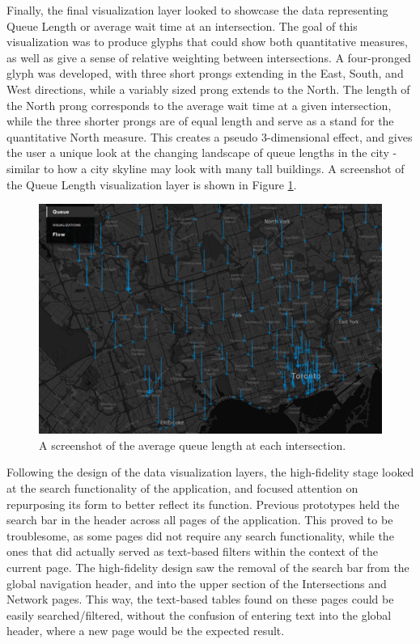 \documentclass{report}
\begin{document}
Finally, the final visualization layer looked to showcase the data representing Queue Length or average wait time at an intersection.
The goal of this visualization was to produce glyphs that could show both quantitative measures, as well as give a sense of relative weighting between intersections.
A four-pronged glyph was developed, with three short prongs extending in the East, South, and West directions, while a variably sized prong extends to the North.
The length of the North prong corresponds to the average wait time at a given intersection, while the three shorter prongs are of equal length and serve as a stand for the quantitative North measure.
This creates a pseudo 3-dimensional effect, and gives the user a unique look at the changing landscape of queue lengths in the city - similar to how a city skyline may look with many tall buildings.
A screenshot of the Queue Length visualization layer is shown in Figure \ref{fig:queue}.

\begin{figure}[htbp!]
  \begin{centering}
    \includegraphics[scale=0.9]{figures/queue.png}
    \caption{A screenshot of the average queue length at each intersection.}
    \label{fig:queue}
  \end{centering}
\end{figure}

Following the design of the data visualization layers, the high-fidelity stage looked at the search functionality of the application, and focused attention on repurposing its form to better reflect its function.
Previous prototypes held the search bar in the header across all pages of the application.
This proved to be troublesome, as some pages did not require any search functionality, while the ones that did actually served as text-based filters within the context of the current page.
The high-fidelity design saw the removal of the search bar from the global navigation header, and into the upper section of the Intersections and Network pages.
This way, the text-based tables found on these pages could be easily searched/filtered, without the confusion of entering text into the global header, where a new page would be the expected result.
\end{document}
